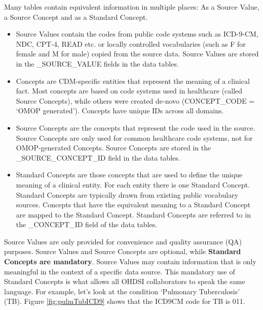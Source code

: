 \documentclass[]{book}
\providecommand{\tightlist}{%
  \setlength{\itemsep}{0pt}\setlength{\parskip}{0pt}}
\begin{document}
Many tables contain equivalent information in multiple places: As a Source Value, a Source Concept and as a Standard Concept.

\begin{itemize}
\tightlist
\item
  Source Values contain the codes from public code systems such as ICD-9-CM, NDC, CPT-4, READ etc. or locally controlled vocabularies (such as F for female and M for male) copied from the source data. Source Values are stored in the \_SOURCE\_VALUE fields in the data tables.
\item
  Concepts are CDM-specific entities that represent the meaning of a clinical fact. Most concepts are based on code systems used in healthcare (called Source Concepts), while others were created de-novo (CONCEPT\_CODE = `OMOP generated'). Concepts have unique IDs across all domains.
\item
  Source Concepts are the concepts that represent the code used in the source. Source Concepts are only used for common healthcare code systems, not for OMOP-generated Concepts. Source Concepts are stored in the \_SOURCE\_CONCEPT\_ID field in the data tables.
\item
  Standard Concepts are those concepts that are used to define the unique meaning of a clinical entity. For each entity there is one Standard Concept. Standard Concepts are typically drawn from existing public vocabulary sources. Concepts that have the equivalent meaning to a Standard Concept are mapped to the Standard Concept. Standard Concepts are referred to in the \_CONCEPT\_ID field of the data tables.
\end{itemize}

Source Values are only provided for convenience and quality assurance (QA) purposes. Source Values and Source Concepts are optional, while \textbf{Standard Concepts are mandatory}. Source Values may contain information that is only meaningful in the context of a specific data source. This mandatory use of Standard Concepts is what allows all OHDSI collaborators to speak the same language. For example, let's look at the condition `Pulmonary Tuberculosis' (TB). Figure \ref{fig:pulmTubICD9} shows that the ICD9CM code for TB is 011.
\end{document}
